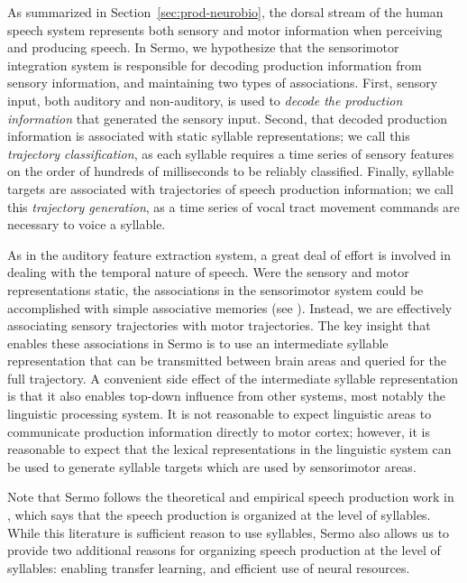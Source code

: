 
As summarized in Section~\ref{sec:prod-neurobio},
the dorsal stream of the human speech system
represents both sensory and motor information
when perceiving and producing speech.
In Sermo,
we hypothesize that
the sensorimotor integration system
is responsible for decoding production information
from sensory information,
and maintaining two types of associations.
First, sensory input,
both auditory and non-auditory,
is used to \textit{decode the production information}
that generated the sensory input.
Second, that decoded production information
is associated with
static syllable representations;
we call this \textit{trajectory classification},
as each syllable requires
a time series of sensory features
on the order of hundreds of milliseconds
to be reliably classified.
Finally, syllable targets are associated with
trajectories of speech production information;
we call this \textit{trajectory generation},
as a time series of vocal tract movement commands
are necessary to voice a syllable.

As in the auditory feature extraction system,
a great deal of effort is involved in
dealing with the temporal nature of speech.
Were the sensory and motor representations static,
the associations in the sensorimotor system
could be accomplished
with simple associative memories
(see \citealt{eliasmith2012,eliasmith2013}).
Instead, we are effectively associating
sensory trajectories with motor trajectories.
The key insight
that enables these associations in Sermo
is to use an intermediate syllable representation
that can be transmitted between
brain areas and queried
for the full trajectory.
A convenient side effect of
the intermediate syllable representation
is that it also enables
top-down influence from
other systems,
most notably the linguistic processing system.
It is not reasonable to expect
linguistic areas to communicate
production information directly
to motor cortex;
however, it is reasonable to expect
that the lexical representations
in the linguistic system
can be used to generate syllable targets
which are used by sensorimotor areas.

Note that Sermo follows
the theoretical and empirical
speech production work
in \citet{levelt1994,levelt1999,cholin2004},
which says that the
speech production is organized
at the level of syllables.
While this literature
is sufficient reason to use syllables,
Sermo also allows us to
provide two additional reasons
for organizing speech production
at the level of syllables:
enabling transfer learning,
and efficient use of neural resources.

